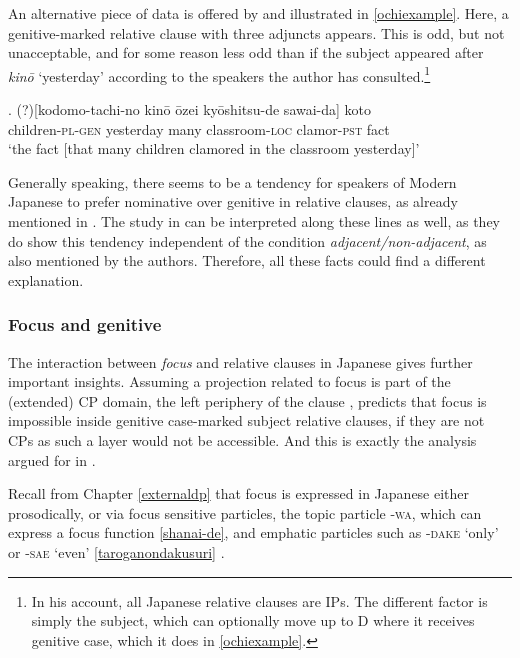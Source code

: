 \documentclass [output=book,colorlinks,citecolor=brown]{langscibook}
\begin{document}
An alternative piece of data is offered by \citet{ochi:2021:feature} and illustrated in \ref{ochiexample}. Here, a genitive-marked relative clause with three adjuncts appears. This is odd, but not unacceptable, and for some reason less odd than if the subject appeared after \textit{kinō} `yesterday' according to the speakers the author has consulted.\footnote{In his account, all Japanese relative clauses are IPs. The different factor is simply the subject, which can optionally move up to D where it receives genitive case, which it does in \ref{ochiexample}.}

\exg. (?)[kodomo-tachi-no kinō ōzei kyōshitsu-de sawai-da] koto\\
children-\textsc{pl-gen} yesterday many classroom-\textsc{loc} clamor-\textsc{pst} fact\\
`the fact [that many children clamored in the classroom yesterday]’ \\ \null\hfill \citep[326]{ochi:2021:feature} \label{ochiexample}

Generally speaking, there seems to be a tendency for speakers of Modern Japanese to prefer nominative over genitive in relative clauses, as already mentioned in \citet{harada:1971:ga}. The study in \citet{nambu:2014:an, nambu:2023:experimental} can be interpreted along these lines as well, as they do show this tendency independent of the condition \textit{adjacent/non-adjacent}, as also mentioned by the authors. Therefore, all these facts could find a different explanation.

\subsubsection{Focus and genitive} \label{focusrc}

The interaction between \textit{focus} and relative clauses in Japanese gives further important insights. Assuming a projection related to focus is part of the (extended) CP domain, the left periphery of the clause \citep{rizzi:1997:the}, predicts that focus is impossible inside genitive case-marked subject relative clauses, if they are not CPs as such a layer would not be accessible. And this is exactly the analysis argued for in \citet{miyagawa:2017:agreement}. %

Recall from Chapter \ref{externaldp} that focus is expressed in Japanese either prosodically, or via focus sensitive particles, the topic particle -\textsc{wa}, which can express a focus function \ref{shanai-de}, and emphatic particles such as -\textsc{dake} `only' or -\textsc{sae} `even’ \ref{taroganondakusuri} \citep{tomioka:2009:contrastive, tomioka:2016:infor, vermeulen:2007:jap}.
\end{document}
